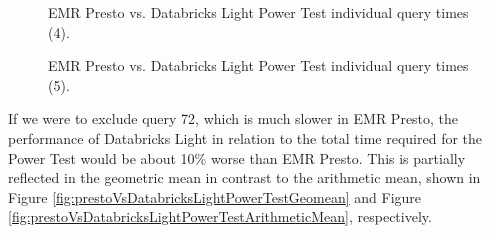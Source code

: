 \begin{figure}
   \begin{center}
   \end{center}
   \caption{EMR Presto vs. Databricks Light Power Test individual query times (4).}
   \label{fig:prestoVsDatabricksLightPowerTestIndividualQueries4}
\end{figure}

\begin{figure}
   \begin{center}
   \end{center}
   \caption{EMR Presto vs. Databricks Light Power Test individual query times (5).}
   \label{fig:prestoVsDatabricksLightPowerTestIndividualQueries5}
\end{figure}

If we were to exclude query 72, which is much slower in EMR Presto, the performance of Databricks Light in relation to the total time required for the Power Test would be about 10\% worse than EMR Presto. This is partially reflected in the geometric mean in contrast to the arithmetic mean, shown in Figure \ref{fig:prestoVsDatabricksLightPowerTestGeomean} and Figure \ref{fig:prestoVsDatabricksLightPowerTestArithmeticMean}, respectively.

